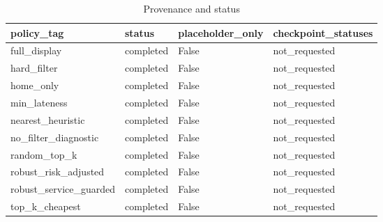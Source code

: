 \begin{table}[ht]
\centering
\begin{tabular}{llll}
 \hline
policy\_tag & status & placeholder\_only & checkpoint\_statuses \\
 \hline
full\_display & completed & False & not\_requested \\
hard\_filter & completed & False & not\_requested \\
home\_only & completed & False & not\_requested \\
min\_lateness & completed & False & not\_requested \\
nearest\_heuristic & completed & False & not\_requested \\
no\_filter\_diagnostic & completed & False & not\_requested \\
random\_top\_k & completed & False & not\_requested \\
robust\_risk\_adjusted & completed & False & not\_requested \\
robust\_service\_guarded & completed & False & not\_requested \\
top\_k\_cheapest & completed & False & not\_requested \\
 \hline
\end{tabular}
\caption{Provenance and status}
\end{table}
